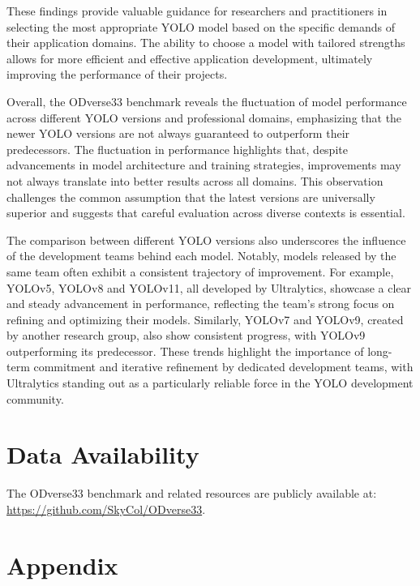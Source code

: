 \documentclass[runningheads]{llncs}
\begin{document}
These findings provide valuable guidance for researchers and practitioners in selecting the most appropriate YOLO model based on the specific demands of their application domains. The ability to choose a model with tailored strengths allows for more efficient and effective application development, ultimately improving the performance of their projects.

Overall, the ODverse33 benchmark reveals the fluctuation of model performance across different YOLO versions and professional domains, emphasizing that the newer YOLO versions are not always guaranteed to outperform their predecessors. The fluctuation in performance highlights that, despite advancements in model architecture and training strategies, improvements may not always translate into better results across all domains. This observation challenges the common assumption that the latest versions are universally superior and suggests that careful evaluation across diverse contexts is essential.

The comparison between different YOLO versions also underscores the influence of the development teams behind each model. Notably, models released by the same team often exhibit a consistent trajectory of improvement. For example, YOLOv5, YOLOv8 and YOLOv11, all developed by Ultralytics, showcase a clear and steady advancement in performance, reflecting the team's strong focus on refining and optimizing their models. Similarly, YOLOv7 and YOLOv9, created by another research group, also show consistent progress, with YOLOv9 outperforming its predecessor. These trends highlight the importance of long-term commitment and iterative refinement by dedicated development teams, with Ultralytics standing out as a particularly reliable force in the YOLO development community.

\section*{Data Availability}
The ODverse33 benchmark and related resources are publicly available at: \url{https://github.com/SkyCol/ODverse33}.

%
%







\newpage
\section*{Appendix}
\end{document}
